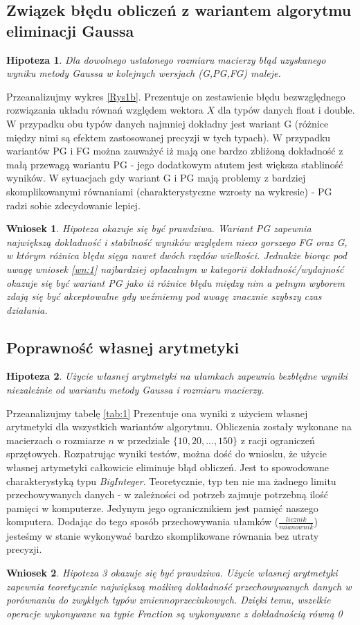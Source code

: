 \documentclass[10pt]{article}
\newtheorem{hip}{Hipoteza}
\newtheorem{wn}{Wniosek}
\begin{document}
\subsection{Związek błędu obliczeń z wariantem algorytmu eliminacji Gaussa}
\begin{hip}
	Dla dowolnego ustalonego rozmiaru macierzy błąd uzyskanego wyniku metody Gaussa w kolejnych wersjach (G,PG,FG) maleje.\label{hip:2}
\end{hip}
Przeanalizujmy wykres \ref{Rys1b}. Prezentuje on zestawienie błędu bezwzględnego rozwiązania układu równań względem wektora $X$ dla typów danych float i double. W przypadku obu typów danych najmniej dokładny jest wariant G (różnice między nimi są efektem zastosowanej precyzji w tych typach). W przypadku wariantów PG i FG można zauważyć iż mają one bardzo zbliżoną dokładność z małą przewagą wariantu PG - jego dodatkowym atutem jest większa stabliność wyników. W sytuacjach gdy wariant G i PG mają problemy z bardziej skomplikowanymi równaniami (charakterystyczne wzrosty na wykresie) - PG radzi sobie zdecydowanie lepiej.
\begin{wn}
	Hipoteza okazuje się być prawdziwa. Wariant PG zapewnia największą dokładność i stabilność wyników względem nieco gorszego FG oraz G, w którym różnica błędu sięga nawet dwóch rzędów wielkości. Jednakże biorąc pod uwagę wniosek \ref{wn:1} najbardziej opłacalnym w kategorii dokładność/wydajność okazuje się być wariant PG jako iż różnice błędu między nim a pełnym wyborem zdają się być akceptowalne gdy weźmiemy pod uwagę znacznie szybszy czas działania.\label{wn:2}
\end{wn}
\subsection{Poprawność własnej arytmetyki}
\begin{hip}
	Użycie własnej arytmetyki na ułamkach zapewnia bezbłędne wyniki niezależnie od wariantu metody Gaussa i rozmiaru macierzy.\label{hip:3}
\end{hip}
Przeanalizujmy tabelę \ref{tab:1}
Prezentuje ona wyniki z użyciem własnej arytmetyki dla wszystkich wariantów algorytmu.
Obliczenia zostały wykonane na macierzach o rozmiarze $n$ w przedziale $\{10,20,...,150\}$ z racji ograniczeń sprzętowych. Rozpatrując wyniki testów, można dość do wniosku, że użycie własnej artymetyki całkowicie eliminuje błąd obliczeń. Jest to spowodowane charakterystyką typu \textit{BigInteger}. Teoretycznie, typ ten nie ma żadnego limitu przechowywanych danych - w zależności od potrzeb zajmuje potrzebną ilość pamięci w komputerze. Jedynym jego ogranicznikiem jest pamięć naszego komputera. Dodając do tego sposób przechowywania ułamków ($\frac{licznik}{mianownik}$) jesteśmy w stanie wykonywać bardzo skomplikowane równania bez utraty precyzji.
\begin{wn}
	Hipoteza 3 okazuje się być prawdziwa. Użycie własnej arytmetyki zapewnia teoretycznie największą możliwą dokładność przechowywanych danych w porównaniu do zwykłych typów zmiennoprzecinkowych. Dzięki temu, wszelkie operacje wykonywane na typie Fraction są wykonywane z dokładnością równą 0\label{wn:3}
\end{wn}
\end{document}
